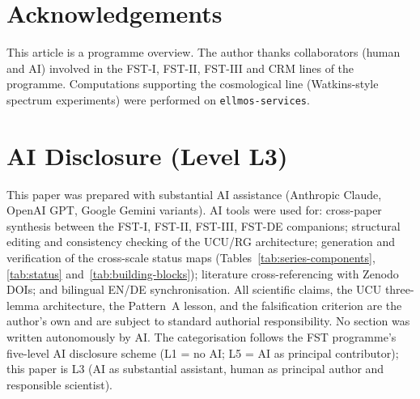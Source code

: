 \documentclass[11pt,a4paper]{article}
\theoremstyle{remark}
\begin{document}
\section*{Acknowledgements}
This article is a programme overview. The author thanks collaborators
(human and AI) involved in the FST-I, FST-II, FST-III and CRM lines
of the programme. Computations supporting the cosmological line
(Watkins-style spectrum experiments) were performed on
\texttt{ellmos-services}.

\section*{AI Disclosure (Level L3)}
This paper was prepared with substantial AI assistance (Anthropic
Claude, OpenAI GPT, Google Gemini variants). AI tools were used for:
cross-paper synthesis between the FST-I, FST-II, FST-III, FST-DE
companions; structural editing and consistency checking of the
UCU/RG architecture; generation and verification of the cross-scale
status maps (Tables~\ref{tab:series-components},
\ref{tab:status} and~\ref{tab:building-blocks}); literature
cross-referencing with Zenodo DOIs; and bilingual EN/DE
synchronisation. All scientific claims, the UCU three-lemma
architecture, the Pattern~A lesson, and the falsification criterion
are the author's own and are subject to standard authorial
responsibility. No section was written autonomously by AI.
The categorisation follows the FST programme's five-level AI
disclosure scheme (L1 = no AI; L5 = AI as principal contributor);
this paper is L3 (AI as substantial assistant, human as principal
author and responsible scientist).
\end{document}
